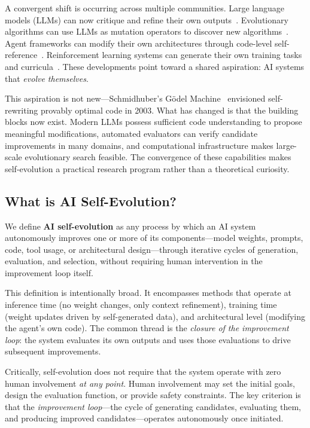 \documentclass[11pt,a4paper]{article}
\begin{document}
A convergent shift is occurring across multiple communities. Large language models (LLMs) can now critique and refine their own outputs~\citep{madaan2023selfrefine}. Evolutionary algorithms can use LLMs as mutation operators to discover new algorithms~\citep{novikov2025alphaevolve,romera2024funsearch}. Agent frameworks can modify their own architectures through code-level self-reference~\citep{hu2024adas,zhang2025dgm}. Reinforcement learning systems can generate their own training tasks and curricula~\citep{zhao2025absolute_zero}. These developments point toward a shared aspiration: AI systems that \emph{evolve themselves}.

This aspiration is not new---Schmidhuber's G\"{o}del Machine~\citep{schmidhuber2003godel} envisioned self-rewriting provably optimal code in 2003. What has changed is that the building blocks now exist. Modern LLMs possess sufficient code understanding to propose meaningful modifications, automated evaluators can verify candidate improvements in many domains, and computational infrastructure makes large-scale evolutionary search feasible. The convergence of these capabilities makes self-evolution a practical research program rather than a theoretical curiosity.

\subsection{What is AI Self-Evolution?}

We define \textbf{AI self-evolution} as any process by which an AI system autonomously improves one or more of its components---model weights, prompts, code, tool usage, or architectural design---through iterative cycles of generation, evaluation, and selection, without requiring human intervention in the improvement loop itself.

This definition is intentionally broad. It encompasses methods that operate at inference time (no weight changes, only context refinement), training time (weight updates driven by self-generated data), and architectural level (modifying the agent's own code). The common thread is the \emph{closure of the improvement loop}: the system evaluates its own outputs and uses those evaluations to drive subsequent improvements.

Critically, self-evolution does not require that the system operate with zero human involvement \emph{at any point}. Human involvement may set the initial goals, design the evaluation function, or provide safety constraints. The key criterion is that the \emph{improvement loop}---the cycle of generating candidates, evaluating them, and producing improved candidates---operates autonomously once initiated.
\end{document}
